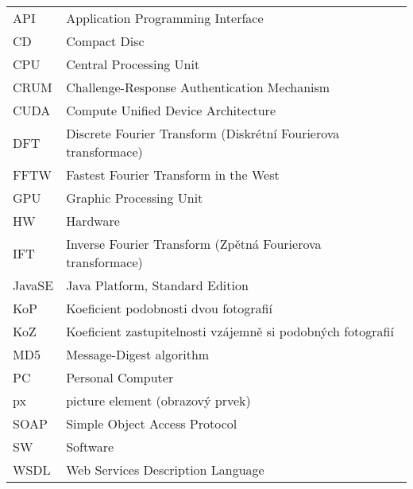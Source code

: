 
\seznamzkr

\begin{tabular}{ll}
  API		& Application Programming Interface									\\
  CD		& Compact Disc														\\
  CPU		& Central Processing Unit											\\
  CRUM		& Challenge-Response Authentication Mechanism						\\
  CUDA		& Compute Unified Device Architecture								\\
  DFT		& Discrete Fourier Transform (Diskrétní Fourierova transformace)	\\
  FFTW		& Fastest Fourier Transform in the West 							\\
  GPU		& Graphic Processing Unit											\\
  HW		& Hardware															\\
  IFT		& Inverse Fourier Transform (Zpětná Fourierova transformace)		\\
  JavaSE	& Java Platform, Standard Edition									\\
  KoP		& Koeficient podobnosti dvou fotografií								\\
  KoZ		& Koeficient zastupitelnosti vzájemně si podobných fotografií		\\
  MD5		& Message-Digest algorithm											\\
  PC		& Personal Computer													\\
  px		& picture element (obrazový prvek)									\\
  SOAP		& Simple Object Access Protocol										\\
  SW		& Software															\\
  WSDL		& Web Services Description Language									\\
\end{tabular}

